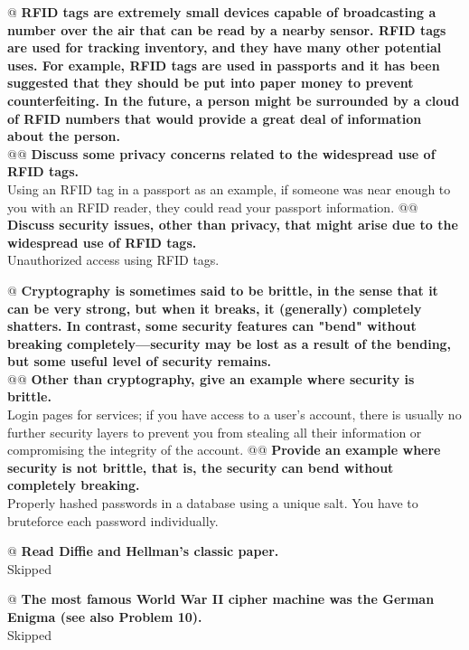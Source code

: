 \documentclass{article}
\begin{document}
\begin{easylist}
 	@ \textbf{RFID tags are extremely small devices capable of broadcasting a number over the air that can be read by a nearby sensor. RFID tags are used for tracking inventory, and they have many other potential uses. For example, RFID tags are used in passports and it has been suggested that they should be put into paper money to prevent counterfeiting. In the future, a person might be surrounded by a cloud of RFID numbers that would provide a great deal of information about the person.}\\
 	@@ \textbf{Discuss some privacy concerns related to the widespread use of RFID tags.}\\
 		Using an RFID tag in a passport as an example, if someone was near enough to you with an RFID reader, they could read your passport information.
 	@@ \textbf{Discuss security issues, other than privacy, that might arise due to the widespread use of RFID tags.}\\
 		Unauthorized access using RFID tags.
 	
 	@ \textbf{Cryptography is sometimes said to be brittle, in the sense that it can be very strong, but when it breaks, it (generally) completely shatters. In contrast, some security features can "bend" without breaking completely—security may be lost as a result of the bending, but some useful level of security remains.}\\
 	@@ \textbf{Other than cryptography, give an example where security is brittle.}\\
 		Login pages for services; if you have access to a user's account, there is usually no further security layers to prevent you from stealing all their information or compromising the integrity of the account.
 	@@ \textbf{Provide an example where security is not brittle, that is, the security can bend without completely breaking.}\\
 		Properly hashed passwords in a database using a unique salt. You have to bruteforce each password individually.
 	
 	@ \textbf{Read Diffie and Hellman's classic paper.}\\
 		Skipped
 	
 	@ \textbf{The most famous World War II cipher machine was the German Enigma (see also Problem 10).}\\
 		Skipped
 	

\end{easylist}
\end{document}
